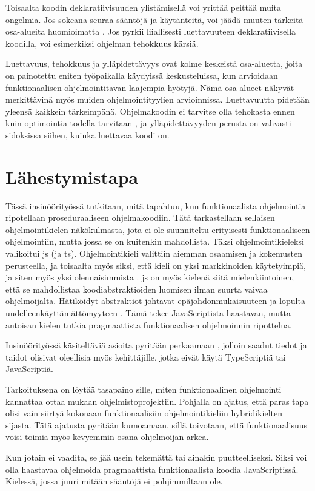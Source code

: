 Toisaalta koodin deklaratiivisuuden ylistämisellä voi yrittää peittää muita ongelmia. Jos sokeana seuraa sääntöjä ja käytänteitä, voi jäädä muuten tärkeitä osa-alueita huomioimatta \cite{functional_fixedness}. Jos pyrkii liiallisesti luettavuuteen deklaratiivisella koodilla, voi esimerkiksi ohjelman tehokkuus kärsiä.

Luettavuus, tehokkuus ja ylläpidettävyys ovat kolme keskeistä osa-aluetta, joita on painotettu eniten työpaikalla käydyissä keskusteluissa, kun arvioidaan funktionaalisen ohjelmointitavan laajempia hyötyjä. Nämä osa-alueet näkyvät merkittävinä myös muiden ohjelmointityylien arvioinnissa. Luettavuutta pidetään yleensä kaikkein tärkeimpänä. Ohjelmakoodin ei tarvitse olla tehokasta ennen kuin optimointia todella tarvitaan \cite{prematureoptimization}, ja ylläpidettävyyden perusta on vahvasti sidoksissa siihen, kuinka luettavaa koodi on.

\section{Lähestymistapa}

Tässä insinöörityössä tutkitaan, mitä tapahtuu, kun funktionaalista ohjelmointia ripotellaan proseduraaliseen ohjelmakoodiin. Tätä tarkastellaan sellaisen ohjelmointikielen näkökulmasta, jota ei ole suunniteltu erityisesti funktionaaliseen ohjelmointiin, mutta jossa se on kuitenkin mahdollista. Täksi ohjelmointikieleksi valikoitui \gls{js} (ja \gls{ts}). Ohjelmointikieli valittiin aiemman osaamisen ja kokemusten perusteella, ja toisaalta myös siksi, että kieli on yksi markkinoiden käytetyimpiä, ja siten myös yksi olennaisimmista \cite{pypl:lang}. \Gls{js} on myös kielenä siitä mielenkiintoinen, että se mahdollistaa koodiabstraktioiden luomisen ilman suurta vaivaa ohjelmoijalta. Hätiköidyt abstraktiot johtavat epäjohdonmukaisuuteen ja lopulta uudelleenkäyttämättömyyteen \cite{dijkstra_humble_programmer}. Tämä tekee JavaScriptista haastavan, mutta antoisan kielen tutkia pragmaattista funktionaalisen ohjelmoinnin ripottelua.


Insinöörityössä käsiteltäviä asioita pyritään perkaamaan , jolloin saadut tiedot ja taidot olisivat oleellisia myös kehittäjille, jotka eivät käytä TypeScriptiä tai JavaScriptiä.

Tarkoituksena on löytää tasapaino sille, miten funktionaalinen ohjelmointi kannattaa ottaa mukaan ohjelmistoprojektiin. Pohjalla on ajatus, että paras tapa olisi vain siirtyä kokonaan funktionaalisiin ohjelmointikieliin hybridikielten sijasta. Tätä ajatusta pyritään kumoamaan, sillä toivotaan, että funktionaalisuus voisi toimia myös kevyemmin osana ohjelmoijan arkea.

Kun jotain ei vaadita, se jää usein tekemättä tai ainakin puutteelliseksi. Siksi voi olla haastavaa ohjelmoida pragmaattista funktionaalista koodia JavaScriptissä. Kielessä, jossa juuri mitään sääntöjä ei pohjimmiltaan ole.
